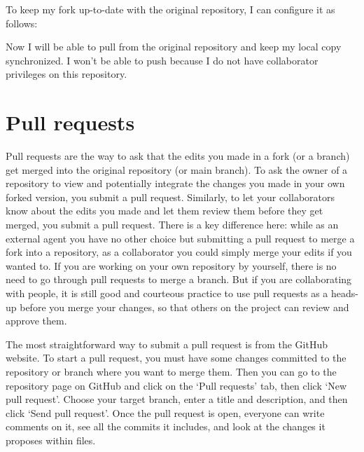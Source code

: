 \documentclass[
]{book}
\newenvironment{Shaded}{\begin{snugshade}}{\end{snugshade}}
\newcommand{\ExtensionTok}[1]{#1}
\newcommand{\NormalTok}[1]{#1}
\begin{document}
To keep my fork up-to-date with the original repository, I can configure it as follows:

\begin{Shaded}
\end{Shaded}

Now I will be able to pull from the original repository and keep my local copy synchronized. I won't be able to push because I do not have collaborator privileges on this repository.

\hypertarget{pull-requests}{%
\section{Pull requests}\label{pull-requests}}

Pull requests are the way to ask that the edits you made in a fork (or a branch) get merged into the original repository (or main branch). To ask the owner of a repository to view and potentially integrate the changes you made in your own forked version, you submit a pull request. Similarly, to let your collaborators know about the edits you made and let them review them before they get merged, you submit a pull request. There is a key difference here: while as an external agent you have no other choice but submitting a pull request to merge a fork into a repository, as a collaborator you could simply merge your edits if you wanted to. If you are working on your own repository by yourself, there is no need to go through pull requests to merge a branch. But if you are collaborating with people, it is still good and courteous practice to use pull requests as a heads-up before you merge your changes, so that others on the project can review and approve them.

The most straightforward way to submit a pull request is from the GitHub website. To start a pull request, you must have some changes committed to the repository or branch where you want to merge them. Then you can go to the repository page on GitHub and click on the `Pull requests' tab, then click `New pull request'. Choose your target branch, enter a title and description, and then click `Send pull request'. Once the pull request is open, everyone can write comments on it, see all the commits it includes, and look at the changes it proposes within files.
\end{document}
